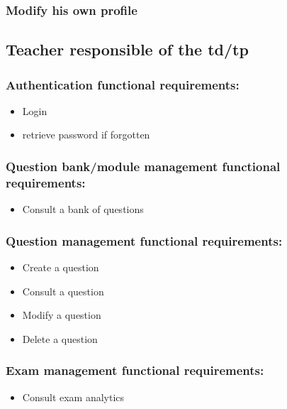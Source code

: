 \documentclass[a4paper,12p]{article}
\begin{document}
        \subsubsection{Modify his own profile}


     \subsection{Teacher responsible of the td/tp}
     \subsubsection{Authentication functional requirements:}
     \begin{itemize}
         \item Login
         \item retrieve password if forgotten
     \end{itemize}

     \subsubsection{Question bank/module management functional requirements:}
     \begin{itemize}
         \item Consult a bank of questions
     \end{itemize}

     \subsubsection{Question management functional requirements:}
     \begin{itemize}
         \item Create a question
         \item Consult a question
         \item Modify a question
         \item Delete a question
     \end{itemize}

     \subsubsection{Exam management functional requirements:}
     \begin{itemize}
         \item Consult exam analytics
     \end{itemize}
\end{document}
